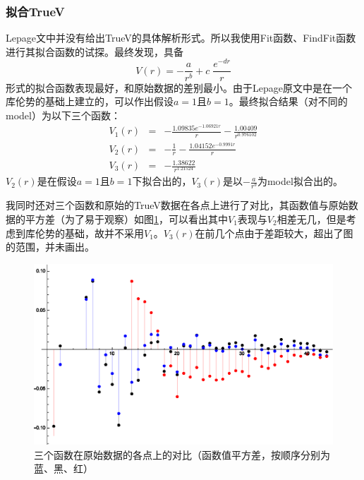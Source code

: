 \documentclass[hyperref,cs4size,titlepage,twoside]{ctexart}
\begin{document}
\subsubsection{拟合TrueV}
Lepage文中并没有给出TrueV的具体解析形式。所以我使用Fit函数、FindFit函数进行其拟合函数的试探。最终发现，具备
$$
V(r)=-\frac{a}{r^b}+c\;\frac{e^{-dr}}{r}
$$
形式的拟合函数表现最好，和原始数据的差别最小。由于Lepage原文中是在一个库伦势的基础上建立的，可以作出假设$a=1$且$b=1$。最终拟合结果（对不同的model）为以下三个函数：
\begin{eqnarray}
  V_1(r) &=& -\frac{1.09835e^{-1.06921r}}{r}-\frac{1.00409}{r^{0.976102}} \\
  V_2(r) &=& -\frac{1}{r}-\frac{1.04152e^{-0.9991r}}{r} \\
  V_3(r) &=& -\frac{1.38622}{r^{1.21524}}
\end{eqnarray}
$V_2(r)$是在假设$a=1$且$b=1$下拟合出的，$V_3(r)$是以$\displaystyle-\frac{a}{r^b}$为model拟合出的。

我同时还对三个函数和原始的TrueV数据在各点上进行了对比，其函数值与原始数据的平方差（为了易于观察）如图\ref{TrueV}，可以看出其中$V_1$表现与$V_2$相差无几，但是考虑到库伦势的基础，故并不采用$V_1$。$V_3(r)$在前几个点由于差距较大，超出了图的范围，并未画出。
\clearpage
\begin{figure}[!htbp]
  \centering
  \includegraphics[width=4.5in]{Test_ReconstructLepage.eps}
  \caption{三个函数在原始数据的各点上的对比（函数值平方差，按顺序分别为蓝、黑、红）}\label{TrueV}
\end{figure}
\end{document}
